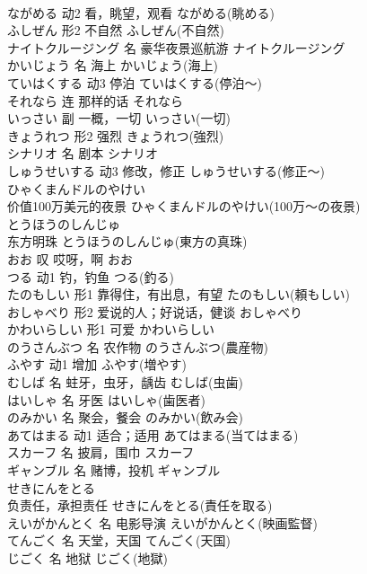 \documentclass[8pt]{extreport}
\begin{document}
\begin{CJK}{UTF8}{min}
\\	ながめる	动2	看，眺望，观看	ながめる(眺める)	
\\	ふしぜん	形2	不自然	ふしぜん(不自然)	
\\	ナイトクルージング	名	豪华夜景巡航游	ナイトクルージング	
\\	かいじょう	名	海上	かいじょう(海上)	
\\	ていはくする	动3	停泊	ていはくする(停泊～)	
\\	それなら	连	那样的话	それなら	
\\	いっさい	副	一概，一切	いっさい(一切)	
\\	きょうれつ	形2	强烈	きょうれつ(強烈)	
\\	シナリオ	名	剧本	シナリオ	
\\	しゅうせいする	动3	修改，修正	しゅうせいする(修正～)	
\\	ひゃくまんドルのやけい	
\\	价值100万美元的夜景	ひゃくまんドルのやけい(100万～の夜景)	
\\	とうほうのしんじゅ	
\\	东方明珠	とうほうのしんじゅ(東方の真珠)	
\\	おお	叹	哎呀，啊	おお	
\\	つる	动1	钓，钓鱼	つる(釣る)	
\\	たのもしい	形1	靠得住，有出息，有望	たのもしい(頼もしい)	
\\	おしゃべり	形2	爱说的人；好说话，健谈	おしゃべり	
\\	かわいらしい	形1	可爱	かわいらしい	
\\	のうさんぶつ	名	农作物	のうさんぶつ(農産物)	
\\	ふやす	动1	增加	ふやす(増やす)	
\\	むしば	名	蛀牙，虫牙，龋齿	むしば(虫歯)	
\\	はいしゃ	名	牙医	はいしゃ(歯医者)	
\\	のみかい	名	聚会，餐会	のみかい(飲み会)	
\\	あてはまる	动1	适合；适用	あてはまる(当てはまる)	
\\	スカーフ	名	披肩，围巾	スカーフ	
\\	ギャンブル	名	赌博，投机	ギャンブル	
\\	せきにんをとる	
\\	负责任，承担责任	せきにんをとる(責任を取る)	
\\	えいがかんとく	名	电影导演	えいがかんとく(映画監督)	
\\	てんごく	名	天堂，天国	てんごく(天国)	
\\	じごく	名	地狱	じごく(地獄)	

\end{CJK}
\end{document}
